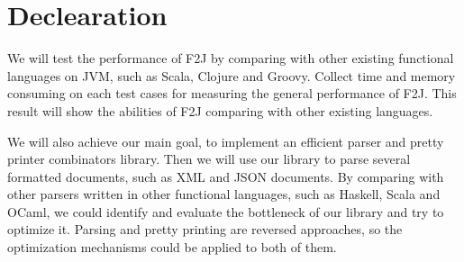 \section*{Declearation}

We will test the performance of F2J by comparing with other existing functional languages on JVM, such as Scala, Clojure and Groovy. Collect time and memory consuming on each test cases for measuring the general performance of F2J. This result will show the abilities of F2J comparing with other existing languages.

We will also achieve our main goal, to implement an efficient parser and pretty printer combinators library. Then we will use our library to parse several formatted documents, such as XML and JSON documents. By comparing with other parsers written in other functional languages, such as Haskell, Scala and OCaml, we could identify and evaluate the bottleneck of our library and try to optimize it. Parsing and pretty printing are reversed approaches, so the optimization mechanisms could be applied to both of them.
